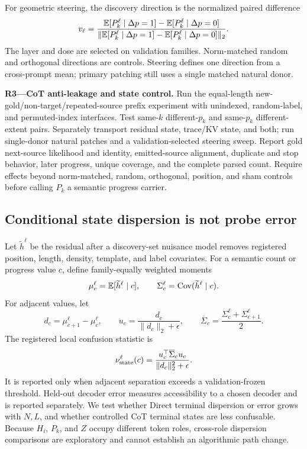 For geometric steering, the discovery direction is the normalized paired
difference
\begin{equation}
  v_\ell=
  \frac{\mathbb{E}[P_k^\ell\mid\Delta p=1]-\mathbb{E}[P_k^\ell\mid\Delta p=0]}
       {\|\mathbb{E}[P_k^\ell\mid\Delta p=1]-\mathbb{E}[P_k^\ell\mid\Delta p=0]\|_2}.
\label{eq:progress-steering}
\end{equation}
The layer and dose are selected on validation families. Norm-matched random
and orthogonal directions are controls. Steering defines one direction from a
cross-prompt mean; primary patching still uses a single matched natural donor.

\begin{todobox}
\textbf{R3---CoT anti-leakage and state control.}
Run the equal-length new-gold/non-target/repeated-source prefix experiment
with unindexed, random-label, and permuted-index interfaces. Test same-\(k\)
different-\(p_k\) and same-\(p_k\) different-extent pairs. Separately
transport residual state, trace/KV state, and both; run single-donor natural
patches and a validation-selected steering sweep. Report gold next-source
likelihood and identity, emitted-source alignment, duplicate and stop
behavior, later progress, unique coverage, and the complete parsed count.
Require effects beyond norm-matched, random, orthogonal, position, and sham
controls before calling \(P_k\) a semantic progress carrier.
\end{todobox}

\subsection{Conditional state dispersion is not probe error}

Let \(\widetilde h^\ell\) be the residual after a discovery-set nuisance model
removes registered position, length, density, template, and label covariates.
For a semantic count or progress value \(c\), define family-equally weighted
moments
\[
  \mu_c^\ell=\mathbb{E}[\widetilde h^\ell\mid c],
  \qquad
  \Sigma_c^\ell=\operatorname{Cov}(\widetilde h^\ell\mid c).
\]
For adjacent values, let
\[
  d_c=\mu_{c+1}^\ell-\mu_c^\ell,\qquad
  u_c=\frac{d_c}{\|d_c\|_2+\epsilon},\qquad
  \overline\Sigma_c=\frac{\Sigma_c^\ell+\Sigma_{c+1}^\ell}{2}.
\]
The registered local confusion statistic is
\begin{equation}
  \nu_{\rm state}^\ell(c)=
  \frac{u_c^\top\overline\Sigma_c u_c}
       {\|d_c\|_2^2+\epsilon}.
\label{eq:state-snr}
\end{equation}
It is reported only when adjacent separation exceeds a validation-frozen
threshold. Held-out decoder error measures accessibility to a chosen decoder
and is reported separately. We test whether Direct terminal dispersion or
error grows with \(N,L\), and whether controlled CoT terminal states are less
confusable. Because \(H_i\), \(P_k\), and \(Z\) occupy different token roles,
cross-role dispersion comparisons are exploratory and cannot establish an
algorithmic path change.
